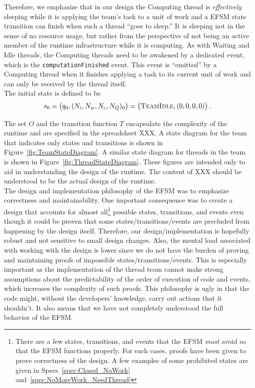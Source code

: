 \documentclass{article}
\newcommand{\TeamIdle}          {\textsc{TeamIdle}}
\begin{document}
Therefore, we emphasize that in our design the Computing thread is
\textit{effectively} sleeping while it is applying the team's task to a unit of
work and a EFSM state transition can finish when such a thread ``goes to
sleep.''  It is sleeping not in the sense of no resource usage, but rather from
the perspective of not being an active member of the runtime infrastructure
while it is computing.  As with Waiting and Idle threads, the Computing threads
need to be awakened by a dedicated event, which is the
\texttt{computationFinished} event.  This event is ``emitted'' by a Computing
thread when it finishes applying a task to its current unit of work and can only
be received by the thread itself.\\

The initial state is defined to be
\[
s_0 = \left(q_0, (N_i, N_w, N_c, N_Q)_0\right) = \left(\TeamIdle, (0, 0, 0, 0)\right).
\]

The set $O$ and the transition function $T$ encapsulate the complexity of the
runtime and are specified in the spreadsheet XXX.  A state diagram for the team
that indicates only states and transitions is shown in
Figure~\ref{fig:TeamStateDiagram}.  A similar state diagram for threads in the
team is shown in Figure~\ref{fig:ThreadStateDiagram}.  These figures are
intended only to aid in understanding the design of the runtime.  The content of
XXX should be understood to be the actual design of the runtime.\\

The design and implementation philosophy of the EFSM was to emphasize
correctness and maintainability.  One important consequence was to create a
design that accounts for almost all\footnote{There are a few states,
transitions, and events that the EFSM \textit{must} avoid so that the EFSM
functions properly.  For such cases, proofs have been given to prove correctness
of the design.  A few examples of some prohibited states are given in
Specs~\ref{spec:Closed_NoWork} and~\ref{spec:NoMoreWork_NeedThread}} possible
states, transitions, and events even though it could be proven that some
states/transitions/events are precluded from happening by the design itself.
Therefore, our design/implementation is hopefully robust and not sensitive to
small design changes.  Also, the mental load associated with working with the
design is lower since we do not have the burden of proving and maintaining
proofs of impossible states/transitions/events.  This is especially important as
the implementation of the thread team cannot make strong assumptions about the
predictability of the order of execution of code and events, which increases the
complexity of such proofs.  This philosophy is ugly in that the code might,
without the developers' knowledge, carry out actions that it shouldn't.  It also
means that we have not completely understood the full behavior of the EFSM.
\end{document}
